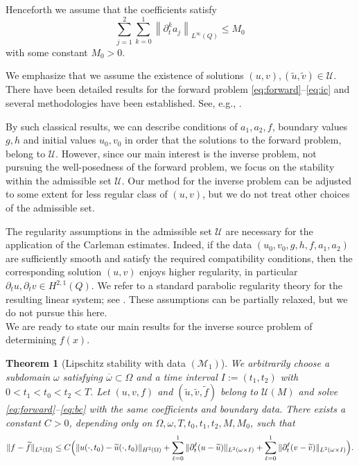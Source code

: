 \documentclass[12pt]{amsart}
\theoremstyle{plain}
\newtheorem{theorem}{Theorem}[section]
\theoremstyle{definition}
\theoremstyle{remark}
\newcommand{\p}{\partial}
\newcommand{\ooo}{\overline}
\newcommand{\www}{\widetilde}
\newcommand{\norm}[1]{\left\lVert#1\right\rVert}
\begin{document}
Henceforth we assume that the coefficients satisfy
\[
\sum_{j=1}^2\sum_{k=0}^1 \norm{\p_t^k a_j}_{L^\infty(Q)}\le M_0
\]
with some constant $M_0 > 0$.


We emphasize that we assume the existence of solutions $(u,v), 
(\www{u}, \www{v}) \in \mathcal{U}$.
There have been detailed results for the forward problem \eqref{eq:forward}--\eqref{eq:ic} and several methodologies have been established. See, e.g.,
\cite{amann1995linear, henry1981geometric, pierre2010global, smoller2012shock}.

By such classical results, we can describe conditions of $a_1, a_2, f$, boundary values $g, h$ and initial values $u_0, v_0$ in order that 
the solutions to the forward problem, belong to $\mathcal{U}$. However, since our main interest is the inverse problem, not pursuing the well-posedness of the forward problem, we focus on the stability within the admissible set $\mathcal{U}$.
Our method for the inverse problem can be adjusted to some extent for less 
regular class of $(u,v)$, but we do not treat other choices of the admissible
set.

The regularity assumptions in the admissible set $\mathcal{U}$ 
are necessary for the application of the Carleman estimates. Indeed, if the data $(u_0,v_0,g,h,f,a_1,a_2)$ are sufficiently smooth and satisfy the required compatibility conditions, then the corresponding solution $(u,v)$ enjoys higher regularity, in particular $\p_t u,\p_t v\in H^{2,1}(Q)$.
We refer to a standard parabolic regularity theory for the resulting linear system; see \cite[Chapter~IV, Theorem~9.1]{ladyzhenskaia1968linear}.
These assumptions can be partially relaxed, but we do not pursue this here.
\\

We are ready to state our main results for the inverse source problem of 
determining $f(x)$.


\begin{theorem}[Lipschitz stability with data $(\mathcal{M}_1)$]
\label{thm:reference}
We arbitrarily choose 
a subdomain $\omega$ satisfying $\ooo{\omega} \subset\Omega$ and 
a time interval $I:= (t_1, t_2)$ with $0<t_1<t_0<t_2<T$.
Let $(u,v,f)$ and $(\widetilde u,\widetilde v,\widetilde f)$ belong to
$\mathcal U(M)$ and solve \eqref{eq:forward}--\eqref{eq:bc} with the
same coefficients and boundary data.
There exists a constant $C>0$, depending only on
$\Omega,\omega,T,t_0,t_1,t_2,M,M_0$, such that
\begin{equation}\label{eq:stab-reference}
\|f-\widetilde f\|_{L^2(\Omega)}
\le C\Bigl(
\|u(\cdot,t_0)-\widetilde u(\cdot,t_0)\|_{H^2(\Omega)}
+\sum_{\ell=0}^1 \|\partial_t^\ell(u-\widetilde u)\|_{L^2(\omega\times I)}
+\sum_{\ell=0}^1 \|\partial_t^\ell(v-\widetilde v)\|_{L^2(\omega\times I)}
\Bigr).
\end{equation}
\end{theorem}
\end{document}
